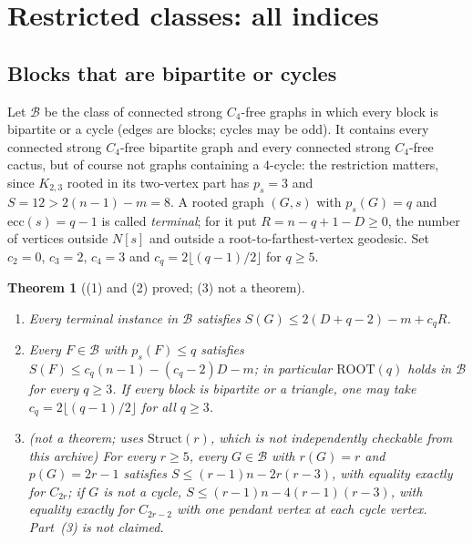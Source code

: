 \documentclass[11pt]{amsart}
\newtheorem{theorem}{Theorem}[section]
\theoremstyle{definition}
\theoremstyle{remark}
\newcommand{\pp}{p}
\newcommand{\ROOT}{\mathrm{ROOT}}
\begin{document}
\section{Restricted classes: all indices}\label{sec:classes}

\subsection{Blocks that are bipartite or cycles}
Let $\mathcal B$ be the class of connected strong $C_4$-free graphs in which every block is bipartite or a cycle (edges are blocks; cycles may be odd). It contains every connected strong $C_4$-free bipartite graph and every connected strong $C_4$-free cactus, but of course not graphs containing a $4$-cycle: the restriction matters, since $K_{2,3}$ rooted in its two-vertex part has $\pp_s=3$ and $S=12>2(n-1)-m=8$. A rooted graph $(G,s)$ with $\pp_s(G)=q$ and $\mathrm{ecc}(s)=q-1$ is called \emph{terminal}; for it put $R=n-q+1-D\ge0$, the number of vertices outside $N[s]$ and outside a root-to-farthest-vertex geodesic. Set $c_2=0$, $c_3=2$, $c_4=3$ and $c_q=2\lfloor(q-1)/2\rfloor$ for $q\ge5$.

\begin{theorem}[\textup{(1)} and \textup{(2)} proved; \textup{(3)} not a theorem]\label{thm:blocks}
\begin{enumerate}
\item Every terminal instance in $\mathcal B$ satisfies $S(G)\le2(D+q-2)-m+c_qR$.
\item Every $F\in\mathcal B$ with $\pp_s(F)\le q$ satisfies $S(F)\le c_q(n-1)-(c_q-2)D-m$; in particular $\ROOT(q)$ holds in $\mathcal B$ for every $q\ge3$. If every block is bipartite or a triangle, one may take $c_q=2\lfloor(q-1)/2\rfloor$ for all $q\ge3$.
\item \textup{(}not a theorem; uses $\mathrm{Struct}(r)$, which is not independently checkable from this archive\textup{)} For every $r\ge5$, every $G\in\mathcal B$ with $r(G)=r$ and $\pp(G)=2r-1$ satisfies $S\le(r-1)n-2r(r-3)$, with equality exactly for $C_{2r}$; if $G$ is not a cycle, $S\le(r-1)n-4(r-1)(r-3)$, with equality exactly for $C_{2r-2}$ with one pendant vertex at each cycle vertex. Part~(3) is not claimed.
\end{enumerate}
\end{theorem}
\end{document}
